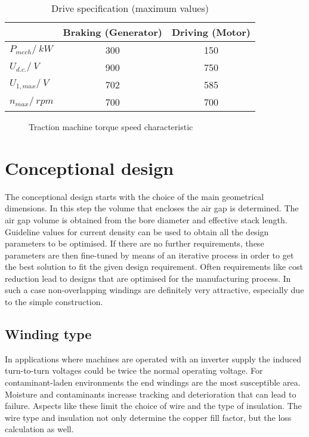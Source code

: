 \begin{table}[htbp]
  \centering
  \caption{Drive specification (maximum values)}
    \begin{tabular}{|l|c|c|}\cline{2-3}
      \multicolumn{1}{c|}{}& Braking (Generator) & Driving (Motor) \\
      \hline
      $P_{mech}/\SI{}{kW}$ & 300 & 150 \\
      $U_{d.c.}/\SI{}{V}$  & 900 & 750 \\
      $U_{1,max}/\SI{}{V}$ & 702 & 585 \\
      $n_{max}/\SI{}{rpm}$ & 700 & 700 \\
      \hline
    \end{tabular}
  \label{tab:DriveSpecification}
\end{table}
\begin{figure}[htbp]
  \centering
    
  \caption{Traction machine torque speed characteristic}
  \label{fig:torq_speed}
\end{figure}

\section{Conceptional design}
The conceptional design starts with the choice of the main geometrical dimensions. In this step the volume that encloses the air gap is determined. The air gap volume is obtained from the bore diameter and effective stack length. Guideline values for current density can be used to obtain all the design parameters to be optimised. 
If there are no further requirements, these parameters are then fine-tuned by means of an iterative process in order to get the best solution to fit the given design requirement.    
Often requirements like cost reduction lead to designs that are optimised for the manufacturing process. In such a case non-overlapping windings are definitely very attractive, especially due to the simple construction. 

\subsection{Winding type}
In applications where machines are operated with an inverter supply the induced turn-to-turn voltages could be twice the normal operating voltage. For contaminant-laden environments the end windings are the most susceptible area. Moisture and contaminants increase tracking and deterioration that can lead to failure. Aspects like these limit the choice of wire and the type of insulation. The wire type and insulation not only determine the copper fill factor, but the loss calculation as well.

